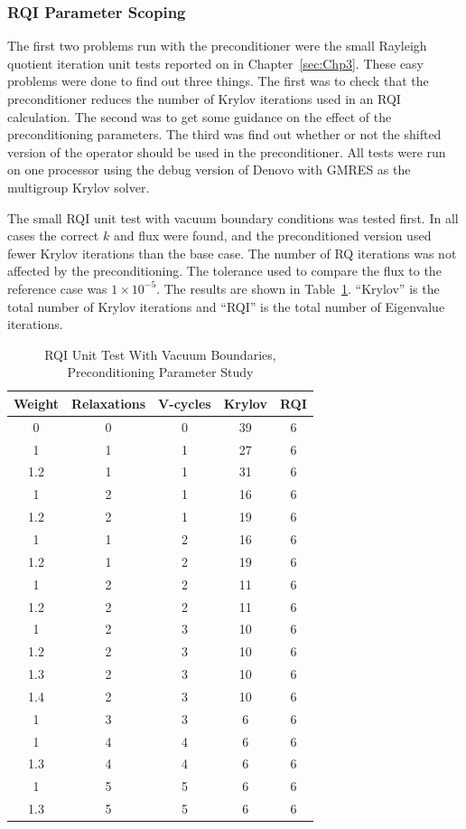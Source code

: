 \subsubsection{RQI Parameter Scoping}
The first two problems run with the preconditioner were the small Rayleigh quotient iteration unit tests reported on in Chapter~\ref{sec:Chp3}. These easy problems were done to find out three things. The first was to check that the preconditioner reduces the number of Krylov iterations used in an RQI calculation. The second was to get some guidance on the effect of the preconditioning parameters. The third was find out whether or not the shifted version of the operator should be used in the preconditioner. All tests were run on one processor using the debug version of Denovo with GMRES as the multigroup Krylov solver.

The small RQI unit test with vacuum boundary conditions was tested first. In all cases the correct $k$ and flux were found, and the preconditioned version used fewer Krylov iterations than the base case. The number of RQ iterations was not affected by the preconditioning. The tolerance used to compare the flux to the reference case was $1 \times 10^{-5}$. The results are shown in Table~\ref{table:RQIUnitTestVac}. ``Krylov'' is the total number of Krylov iterations and ``RQI'' is the total number of Eigenvalue iterations.
%
\begin{table}[!h]
\caption{RQI Unit Test With Vacuum Boundaries, Preconditioning Parameter Study}
\begin{center}
\begin{tabular}{c c c c c}
\hline
Weight & Relaxations & V-cycles & Krylov & RQI \\[0.5ex]
\hline
0    & 0 & 0 & 39 & 6 \\
1    & 1 & 1 & 27 & 6 \\
1.2 & 1 & 1 & 31 & 6 \\
1    & 2 & 1 & 16 & 6 \\
1.2 & 2 & 1 & 19 & 6 \\
1    & 1 & 2 & 16 & 6 \\
1.2 & 1 & 2 & 19 & 6 \\
1    & 2 & 2 & 11 & 6 \\
1.2 & 2 & 2 & 11 & 6 \\
\hline
1    & 2 & 3 & 10 & 6 \\
1.2 & 2 & 3 & 10 & 6 \\
1.3 & 2 & 3 & 10 & 6 \\
1.4 & 2 & 3 & 10 & 6 \\
\hline
1    & 3 & 3 & 6   & 6 \\
1    & 4 & 4 & 6   & 6 \\
1.3 & 4 & 4 & 6   & 6 \\
1    & 5 & 5 & 6   & 6 \\
1.3 & 5 & 5 & 6   & 6 \\
\hline 
\end{tabular}
\end{center}
\label{table:RQIUnitTestVac}
\end{table}

